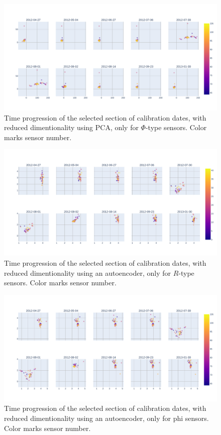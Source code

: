 \begin{figure}[H]
    \centering
    \includegraphics[width=\linewidth]{figures/chapter4/dimred/PCA_module_phi_together.pdf}
    \caption{Time progression of the selected section of calibration dates, with reduced dimentionality using PCA, only for $\Phi$-type sensors. Color marks sensor number.}
   \label{plot:pca_progression_r}
  \end{figure}

\begin{figure}[H]
    \centering
    \includegraphics[width=\linewidth]{figures/chapter4/dimred/NN_module_R_together.pdf}
    \caption{Time progression of the selected section of calibration dates, with reduced dimentionality using an autoencoder, only for $R$-type sensors. Color marks sensor number.}
   \label{plot:nn_progression_r}
  \end{figure}

\begin{figure}[H]
    \centering
    \includegraphics[width=\linewidth]{figures/chapter4/dimred/NN_module_phi_together.pdf}
    \caption{Time progression of the selected section of calibration dates, with reduced dimentionality using an autoencoder, only for phi sensors. Color marks sensor number.}
   \label{plot:nn_progression_phi}
  \end{figure}

